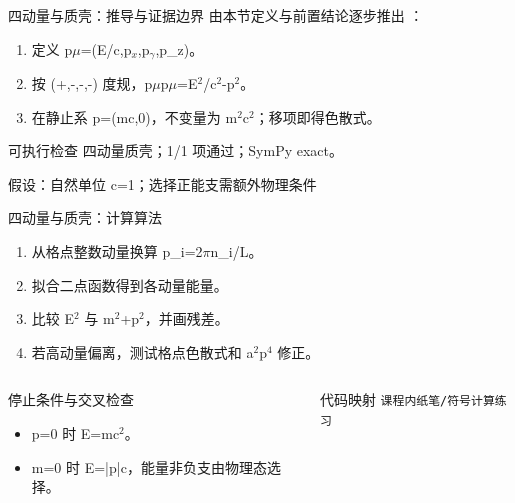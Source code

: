 \begin{frame}[t]{四动量与质壳：推导与证据边界}
\footnotesize
{}\quad 由本节定义与前置结论逐步推出 ：
\begin{enumerate}
\item 定义 p\ensuremath{\mu}=(E/\allowbreak{}c,p\ensuremath{_{x}},p\ensuremath{_{\gamma}},p\_z)。
\item 按 (+,-,-,-) 度规，p\ensuremath{\mu}p\ensuremath{\mu}=E\ensuremath{^{2}}/\allowbreak{}c\ensuremath{^{2}}-p\ensuremath{^{2}}。
\item 在静止系 p=(mc,0)，不变量为 m\ensuremath{^{2}}c\ensuremath{^{2}}；移项即得色散式。
\end{enumerate}\begin{block}{可执行检查}
\quad 四动量质壳；1/1 项通过；SymPy exact。
\par\scriptsize 假设：自然单位 c=1；选择正能支需额外物理条件
\end{block}
\end{frame}

\begin{frame}[t]{四动量与质壳：计算算法}
\footnotesize
{}\begin{enumerate}
\item 从格点整数动量换算 p\_i=2\ensuremath{\pi}n\_i/\allowbreak{}L。
\item 拟合二点函数得到各动量能量。
\item 比较 E\ensuremath{^{2}} 与 m\ensuremath{^{2}}+p\ensuremath{^{2}}，并画残差。
\item 若高动量偏离，测试格点色散式和 a\ensuremath{^{2}}p\ensuremath{^{4}} 修正。
\end{enumerate}\begin{columns}[T,onlytextwidth]
\begin{block}{停止条件与交叉检查}\scriptsize\begin{itemize}
\item[\CheckMark] p=0 时 E=mc\ensuremath{^{2}}。
\item[\CheckMark] m=0 时 E=|p|c，能量非负支由物理态选择。
\end{itemize}\end{block}
\begin{block}{代码映射}
\scriptsize \texttt{课程内纸笔/\allowbreak{}符号计算练习}
\end{block}\end{columns}\end{frame}

